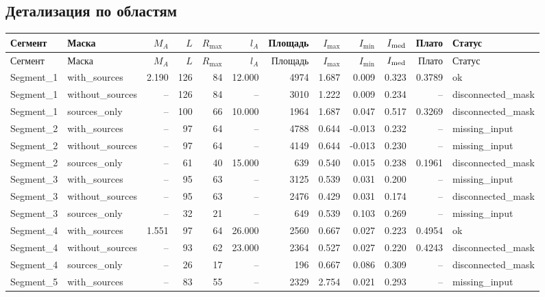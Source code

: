 \documentclass[10pt,a4paper]{article}
\begin{document}
\subsection*{Детализация по областям}
\scriptsize
\setlength{\tabcolsep}{2.7pt}
\begin{longtable}{llrrrrrrrrrl}
\toprule
Сегмент & Маска & $M_A$ & $L$ & $R_{\max}$ & $l_A$ & Площадь & $I_{\max}$ & $I_{\min}$ & $I_{\rm med}$ & Плато & Статус \\
\midrule\endfirsthead
\toprule
Сегмент & Маска & $M_A$ & $L$ & $R_{\max}$ & $l_A$ & Площадь & $I_{\max}$ & $I_{\min}$ & $I_{\rm med}$ & Плато & Статус \\
\midrule\endhead
Segment\_1 & with\_sources & 2.190 & 126 & 84 & 12.000 & 4974 & 1.687 & 0.009 & 0.323 & 0.3789 & ok \\
Segment\_1 & without\_sources & -- & 126 & 84 & -- & 3010 & 1.222 & 0.009 & 0.234 & -- & disconnected\_mask \\
Segment\_1 & sources\_only & -- & 100 & 66 & 10.000 & 1964 & 1.687 & 0.047 & 0.517 & 0.3269 & disconnected\_mask \\
Segment\_2 & with\_sources & -- & 97 & 64 & -- & 4788 & 0.644 & -0.013 & 0.232 & -- & missing\_input \\
Segment\_2 & without\_sources & -- & 97 & 64 & -- & 4149 & 0.644 & -0.013 & 0.230 & -- & missing\_input \\
Segment\_2 & sources\_only & -- & 61 & 40 & 15.000 & 639 & 0.540 & 0.015 & 0.238 & 0.1961 & disconnected\_mask \\
Segment\_3 & with\_sources & -- & 95 & 63 & -- & 3125 & 0.539 & 0.031 & 0.200 & -- & missing\_input \\
Segment\_3 & without\_sources & -- & 95 & 63 & -- & 2476 & 0.429 & 0.031 & 0.174 & -- & disconnected\_mask \\
Segment\_3 & sources\_only & -- & 32 & 21 & -- & 649 & 0.539 & 0.103 & 0.269 & -- & missing\_input \\
Segment\_4 & with\_sources & 1.551 & 97 & 64 & 26.000 & 2560 & 0.667 & 0.027 & 0.223 & 0.4954 & ok \\
Segment\_4 & without\_sources & -- & 93 & 62 & 23.000 & 2364 & 0.527 & 0.027 & 0.220 & 0.4243 & disconnected\_mask \\
Segment\_4 & sources\_only & -- & 26 & 17 & -- & 196 & 0.667 & 0.086 & 0.309 & -- & disconnected\_mask \\
Segment\_5 & with\_sources & -- & 83 & 55 & -- & 2329 & 2.754 & 0.021 & 0.293 & -- & missing\_input \\

\end{longtable}
\end{document}
